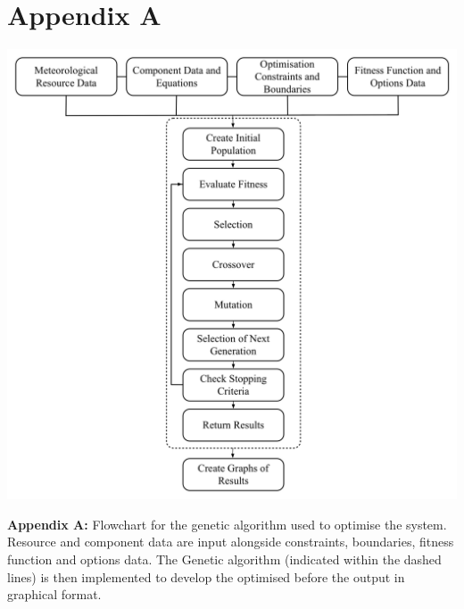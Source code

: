 \newpage
\section*{Appendix A}
\includegraphics[width=2\columnwidth]{Figures/FlowChart.png}
\begin{small}
\onecolumn
\textbf{Appendix A:} Flowchart for the genetic algorithm used to optimise the system. Resource and component data are input alongside constraints, boundaries, fitness function and options data. The Genetic algorithm (indicated within the dashed lines) is then implemented to develop the optimised before the output in graphical format.
\label{fiowChart}
\end{small}
\twocolumn

